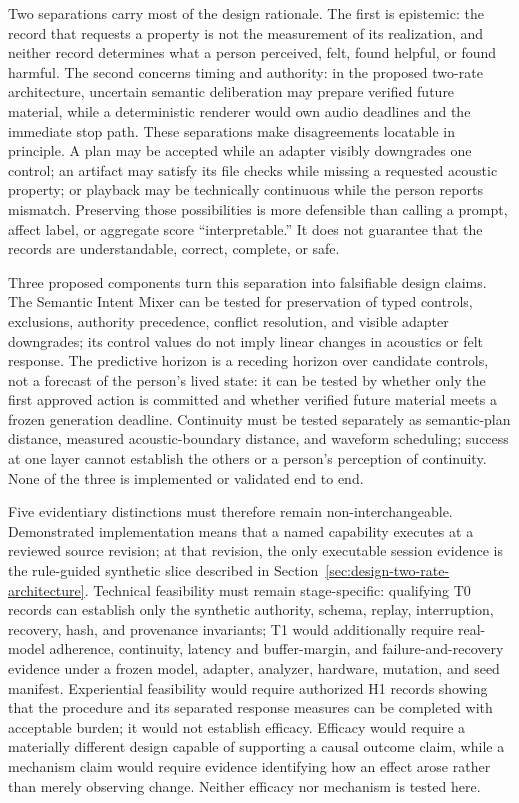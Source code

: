 Two separations carry most of the design rationale. The first is epistemic:
the record that requests a property is not the measurement of its realization,
and neither record determines what a person perceived, felt, found helpful, or
found harmful. The second concerns timing and authority: in the proposed
two-rate architecture, uncertain semantic deliberation may prepare verified
future material, while a deterministic renderer would own audio deadlines and
the immediate stop path. These separations make disagreements locatable in
principle. A plan may be accepted while an adapter visibly downgrades one
control; an artifact may satisfy its file checks while missing a requested
acoustic property; or playback may be technically continuous while the person
reports mismatch. Preserving those possibilities is more defensible than
calling a prompt, affect label, or aggregate score ``interpretable.'' It does
not guarantee that the records are understandable, correct, complete, or safe.

Three proposed components turn this separation into falsifiable design claims.
The Semantic Intent Mixer can be tested for preservation of typed controls,
exclusions, authority precedence, conflict resolution, and visible adapter
downgrades; its control values do not imply linear changes in acoustics or felt
response. The predictive horizon is a receding horizon over candidate controls,
not a forecast of the person's lived state: it can be tested by whether only the
first approved action is committed and whether verified future material meets a
frozen generation deadline. Continuity must be tested separately as
semantic-plan distance, measured acoustic-boundary distance, and waveform
scheduling; success at one layer cannot establish the others or a person's
perception of continuity. None of the three is implemented or validated end to
end.

Five evidentiary distinctions must therefore remain non-interchangeable.
Demonstrated implementation means that a named capability executes at a
reviewed source revision; at that revision, the only executable session
evidence is the rule-guided synthetic slice described in
Section~\ref{sec:design-two-rate-architecture}. Technical feasibility must
remain stage-specific: qualifying T0 records can establish only the synthetic
authority, schema, replay, interruption, recovery, hash, and provenance
invariants; T1 would additionally require real-model adherence, continuity,
latency and buffer-margin, and failure-and-recovery evidence under a frozen
model, adapter, analyzer, hardware, mutation, and seed manifest. Experiential
feasibility would require authorized H1 records showing that the procedure and
its separated response measures can be completed with acceptable burden; it
would not establish efficacy. Efficacy would require a materially different
design capable of supporting a causal outcome claim, while a mechanism claim
would require evidence identifying how an effect arose rather than merely
observing change. Neither efficacy nor mechanism is tested here.

